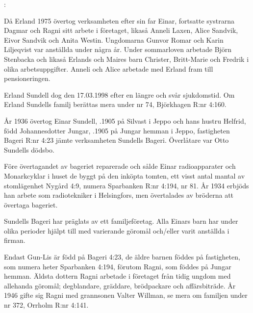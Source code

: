 :

Då Erland 1975 övertog verksamheten efter sin far Einar, fortsatte systrarna Dagmar och Ragni sitt arbete i företaget, likaså Anneli Laxen, Alice Sandvik, Eivor Sandvik och Anita Westin. Ungdomarna Gunvor Romar och Karin Liljeqvist var anställda under några år. Under sommarloven arbetade Björn Stenbacka och likaså Erlands och Maires barn Christer, Britt-Marie och Fredrik i olika arbetsuppgifter. Anneli och Alice arbetade med Erland fram till pensioneringen.

Erland Sundell dog den 17.03.1998 efter en längre och svår sjukdomstid. Om Erland Sundells familj berättas mera under nr 74, Björkhagen R:nr 4:160.


År 1936 övertog Einar Sundell, .1905 på Silvast i Jeppo och hans hustru Helfrid, född Johannesdotter Jungar, .1905 på Jungar hemman i Jeppo, fastigheten Bageri R:nr 4:23 jämte verksamheten Sundells Bageri. Överlåtare var Otto Sundells dödsbo.

Före övertagandet av bageriet reparerade och sålde Einar radioapparater och Monarkcyklar i huset de byggt på den inköpta tomten, ett visst antal mantal av stomlägenhet Nygård 4:9, numera Sparbanken R:nr 4:194, nr 81. År 1934 erbjöds han arbete som radiotekniker i Helsingfors, men övertalades av bröderna att övertaga bageriet.

Sundells Bageri har präglats av ett familjeföretag. Alla Einars barn har under olika perioder hjälpt till med varierande göromål och/eller varit anställda i firman.
\begin{jhchildren}
  \item {}
  \item {}
  \item {}
  \item {}
  \item {}
\end{jhchildren}
Endast Gun-Lis är född på Bageri 4:23, de äldre barnen föddes på fastigheten, som numera heter Sparbanken 4:194, förutom Ragni, som föddes på Jungar hemman. Äldsta dottern Ragni arbetade i företaget från tidig ungdom med allehanda göromål; degblandare, gräddare, brödpackare och affärsbiträde.  År 1946 gifte sig Ragni med grannsonen Valter Willman, se mera om familjen under nr 372, Orrholm R:nr 4:141.

